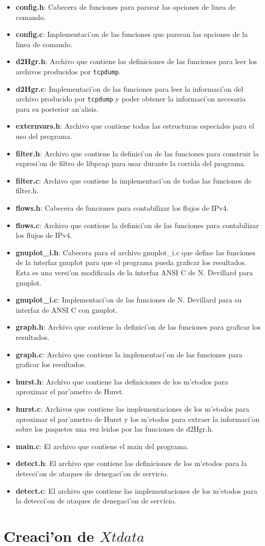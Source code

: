 \begin{itemize}
\item{\bf config.h}: Cabecera de funciones para parsear las opciones de linea
de comando.
\item{\bf config.c}: Implementaci'on de las funciones que parsean las opciones
de la linea de comando.
\item{\bf d2Hgr.h}: Archivo que contiene las definiciones de las funciones para
leer los archivos producidos por {\tt tcpdump}.
\item{\bf d2Hgr.c}: Implementaci'on de las funciones para leer la informaci'on
del archivo producido por {\tt tcpdump} y poder obtener la informaci'on
necesaria para su posterior an'alisis.
\item{\bf externvars.h}: Archivo que contiene todas las estructuras especiales
para el uso del programa.
\item{\bf filter.h}: Archivo que contiene la definici'on de las funciones para
construir la expresi'on de filtro de libpcap para usar durante la corrida del
programa.
\item{\bf filter.c}: Archivo que contiene la implementaci'on de todas las
funciones de filter.h.
\item{\bf flows.h}: Cabecera de funciones para contabilizar los flujos de IPv4.
\item{\bf flows.c}: Archivo que contiene la definici'on de las funciones para
contabilizar los flujos de IPv4.
\item{\bf gnuplot\_i.h}: Cabecera para el archivo gnuplot\_i.c que define las
funciones de la interfaz gnuplot para que el programa pueda graficar los
resultados. Esta es una versi'on modificada de la interfaz ANSI C de N.
Devillard para gnuplot.
\item{\bf gnuplot\_i.c}: Implementaci'on de las funciones de N. Devillard para
su interfaz de ANSI C con gnuplot.
\item{\bf graph.h}: Archivo que contiene la definici'on de las funciones para
graficar los resultados.
\item{\bf graph.c}: Archivo que contiene la implementaci'on de las funciones
para graficar los resultados.
\item{\bf hurst.h}: Archivo que contiene las definiciones de los m'etodos para
aproximar el par'ametro de Hurst.
\item{\bf hurst.c}: Archivos que contiene las implementaciones de los m'etodos
para aproximar el par'ametro de Hurst y los m'etodos para extraer la
informaci'on sobre los paquetes una vez leidos por las funciones de d2Hgr.h.
\item{\bf main.c}: El archivo que contiene el main del programa.
\item{\bf detect.h}: El archivo que contiene las definiciones de los m'etodos 
para la detecci'on de ataques de denegaci'on de servicio.
\item{\bf detect.c}: El archivo que contiene las implementaciones de los 
m'etodos para la detecci'on de ataques de denegaci'on de servicio.
\end{itemize}

\section{Creaci'on de $Xtdata$}




